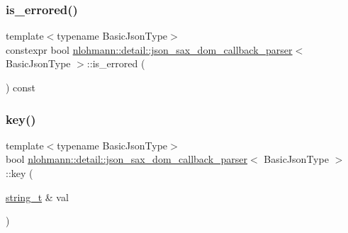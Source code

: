 \subsubsection{\texorpdfstring{is\+\_\+errored()}{is\_errored()}}
{\footnotesize\ttfamily template$<$typename Basic\+Json\+Type$>$ \\
constexpr bool \hyperlink{classnlohmann_1_1detail_1_1json__sax__dom__callback__parser}{nlohmann\+::detail\+::json\+\_\+sax\+\_\+dom\+\_\+callback\+\_\+parser}$<$ Basic\+Json\+Type $>$\+::is\+\_\+errored (\begin{DoxyParamCaption}{ }\end{DoxyParamCaption}) const\hspace{0.3cm}{\ttfamily [inline]}}

\mbox{\label{classnlohmann_1_1detail_1_1json__sax__dom__callback__parser_a0cc4a5192fe9b803276edb831b6099fa}} 
\subsubsection{\texorpdfstring{key()}{key()}}
{\footnotesize\ttfamily template$<$typename Basic\+Json\+Type$>$ \\
bool \hyperlink{classnlohmann_1_1detail_1_1json__sax__dom__callback__parser}{nlohmann\+::detail\+::json\+\_\+sax\+\_\+dom\+\_\+callback\+\_\+parser}$<$ Basic\+Json\+Type $>$\+::key (\begin{DoxyParamCaption}\item[{\hyperlink{classnlohmann_1_1detail_1_1json__sax__dom__callback__parser_a00e7d95d82d5d8a43421526a42a8eabc}{string\+\_\+t} \&}]{val }\end{DoxyParamCaption})\hspace{0.3cm}{\ttfamily [inline]}}

\mbox{\label{classnlohmann_1_1detail_1_1json__sax__dom__callback__parser_a446262b6a75371fe8e0a6218ba2911e6}} 
